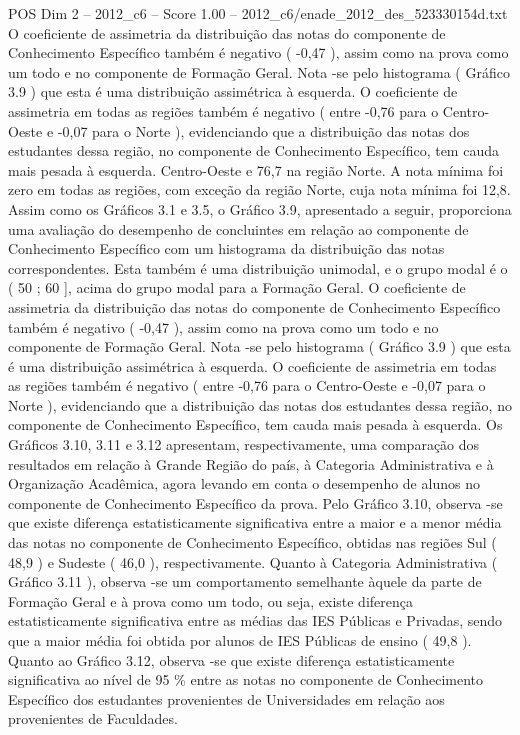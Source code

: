 \begin{textsample}{POS Dim 2 – 2012\_c6 – Score 1.00 – 2012\_c6/enade\_2012\_des\_523330154d.txt}
O coeficiente de assimetria da distribuição das notas do componente de Conhecimento Específico também é negativo ( -0,47 ), assim como na prova como um todo e no componente de Formação Geral.
Nota -se pelo histograma ( Gráfico 3.9 ) que esta é uma distribuição assimétrica à esquerda.
O coeficiente de assimetria em todas as regiões também é negativo ( entre -0,76 para o Centro-Oeste e -0,07 para o Norte ), evidenciando que a distribuição das notas dos estudantes dessa região, no componente de Conhecimento Específico, tem cauda mais pesada à esquerda.
Centro-Oeste e 76,7 na região Norte.
A nota mínima foi zero em todas as regiões, com exceção da região Norte, cuja nota mínima foi 12,8.
Assim como os Gráficos 3.1 e 3.5, o Gráfico 3.9, apresentado a seguir, proporciona uma avaliação do desempenho de concluintes em relação ao componente de Conhecimento Específico com um histograma da distribuição das notas correspondentes.
Esta também é uma distribuição unimodal, e o grupo modal é o ( 50 ; 60 ], acima do grupo modal para a Formação Geral.
O coeficiente de assimetria da distribuição das notas do componente de Conhecimento Específico também é negativo ( -0,47 ), assim como na prova como um todo e no componente de Formação Geral.
Nota -se pelo histograma ( Gráfico 3.9 ) que esta é uma distribuição assimétrica à esquerda.
O coeficiente de assimetria em todas as regiões também é negativo ( entre -0,76 para o Centro-Oeste e -0,07 para o Norte ), evidenciando que a distribuição das notas dos estudantes dessa região, no componente de Conhecimento Específico, tem cauda mais pesada à esquerda.
Os Gráficos 3.10, 3.11 e 3.12 apresentam, respectivamente, uma comparação dos resultados em relação à Grande Região do país, à Categoria Administrativa e à Organização Acadêmica, agora levando em conta o desempenho de alunos no componente de Conhecimento Específico da prova.
Pelo Gráfico 3.10, observa -se que existe diferença estatisticamente significativa entre a maior e a menor média das notas no componente de Conhecimento Específico, obtidas nas regiões Sul ( 48,9 ) e Sudeste ( 46,0 ), respectivamente.
Quanto à Categoria Administrativa ( Gráfico 3.11 ), observa -se um comportamento semelhante àquele da parte de Formação Geral e à prova como um todo, ou seja, existe diferença estatisticamente significativa entre as médias das IES Públicas e Privadas, sendo que a maior média foi obtida por alunos de IES Públicas de ensino ( 49,8 ).
Quanto ao Gráfico 3.12, observa -se que existe diferença estatisticamente significativa ao nível de 95 \% entre as notas no componente de Conhecimento Específico dos estudantes provenientes de Universidades em relação aos provenientes de Faculdades.

\end{textsample}
